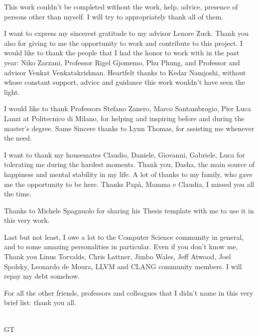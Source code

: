 
This work couldn't be completed without the work, help, advice, presence of persons other than myself. I will try to appropriately thank all of them.

I want to express my sincerest gratitude to my advisor Lenore Zuck. Thank you also for giving to me the opportunity to work and contribute to this project. I would like to thank the people that I had the honor to work with in the past year: Niko Zarzani, Professor Rigel Gjomemo, Phu Phung, and Professor and advisor Venkat Venkatakrishnan. Heartfelt thanks to Kedar Namjoshi, without whose constant support, advice and guidance this work wouldn't have seen the light.

I would like to thank Professors Stefano Zanero, Marco Santambrogio, Pier Luca Lanzi at Politecnico di Milano, for helping and inspiring before and during the master's degree. Same Sincere thanks to Lynn Thomas, for assisting me whenever the need.

I want to thank my housemates Claudio, Daniele, Giovanni, Gabriele, Luca for tolerating me during the hardest moments. Thank you, Dasha, the main source of happiness and mental stability in my life. A lot of thanks to my family, who gave me the opportunity to be here. Thanks Papà, Mamma e Claudia, I missed you all the time.

Thanks to Michele Spagnuolo for sharing his Thesis template with me to use it in this very work.

Last but not least, I owe a lot to the Computer Science community in general, and to some amazing personalities in particular. Even if you don't know me, Thank you Linus Torvalds, Chris Lattner, Jimbo Wales, Jeff Atwood, Joel Spolsky, Leonardo de Moura, LLVM and CLANG community members. I will repay my debt somehow.

For all the other friends, professors and colleagues that I didn't name in this very brief list: thank you all.
\\\\

\begin{flushright}
{\large GT}
\end{flushright}

